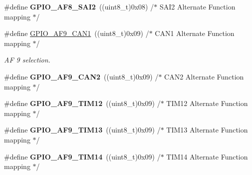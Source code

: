 \begin{DoxyCompactItemize}
\item 
\#define {\bfseries G\+P\+I\+O\+\_\+\+A\+F8\+\_\+\+S\+A\+I2}~((uint8\+\_\+t)0x08)  /$\ast$ S\+A\+I2 Alternate Function mapping   $\ast$/\hypertarget{group___g_p_i_o___alternate__function__selection_ga7ca25beab4589f439dec62845caf123e}{}\label{group___g_p_i_o___alternate__function__selection_ga7ca25beab4589f439dec62845caf123e}

\item 
\#define \hyperlink{group___g_p_i_o___alternate__function__selection_gaf4de931f6e3550743de69176a7f2935a}{G\+P\+I\+O\+\_\+\+A\+F9\+\_\+\+C\+A\+N1}~((uint8\+\_\+t)0x09)  /$\ast$ C\+A\+N1 Alternate Function mapping  $\ast$/\hypertarget{group___g_p_i_o___alternate__function__selection_gaf4de931f6e3550743de69176a7f2935a}{}\label{group___g_p_i_o___alternate__function__selection_gaf4de931f6e3550743de69176a7f2935a}

\begin{DoxyCompactList}\small\item\em AF 9 selection. \end{DoxyCompactList}\item 
\#define {\bfseries G\+P\+I\+O\+\_\+\+A\+F9\+\_\+\+C\+A\+N2}~((uint8\+\_\+t)0x09)  /$\ast$ C\+A\+N2 Alternate Function mapping  $\ast$/\hypertarget{group___g_p_i_o___alternate__function__selection_ga7682ba7b734417fe564c6a0bd2312cb4}{}\label{group___g_p_i_o___alternate__function__selection_ga7682ba7b734417fe564c6a0bd2312cb4}

\item 
\#define {\bfseries G\+P\+I\+O\+\_\+\+A\+F9\+\_\+\+T\+I\+M12}~((uint8\+\_\+t)0x09)  /$\ast$ T\+I\+M12 Alternate Function mapping $\ast$/\hypertarget{group___g_p_i_o___alternate__function__selection_ga49639bf08b261832e4c07779cc634dd7}{}\label{group___g_p_i_o___alternate__function__selection_ga49639bf08b261832e4c07779cc634dd7}

\item 
\#define {\bfseries G\+P\+I\+O\+\_\+\+A\+F9\+\_\+\+T\+I\+M13}~((uint8\+\_\+t)0x09)  /$\ast$ T\+I\+M13 Alternate Function mapping $\ast$/\hypertarget{group___g_p_i_o___alternate__function__selection_ga5ff54ccaa8e7fb6ac516b8c3543e7e7f}{}\label{group___g_p_i_o___alternate__function__selection_ga5ff54ccaa8e7fb6ac516b8c3543e7e7f}

\item 
\#define {\bfseries G\+P\+I\+O\+\_\+\+A\+F9\+\_\+\+T\+I\+M14}~((uint8\+\_\+t)0x09)  /$\ast$ T\+I\+M14 Alternate Function mapping $\ast$/\hypertarget{group___g_p_i_o___alternate__function__selection_ga7687c77dbf42f28bda590cb3eff3f4bd}{}\label{group___g_p_i_o___alternate__function__selection_ga7687c77dbf42f28bda590cb3eff3f4bd}


\end{DoxyCompactItemize}
